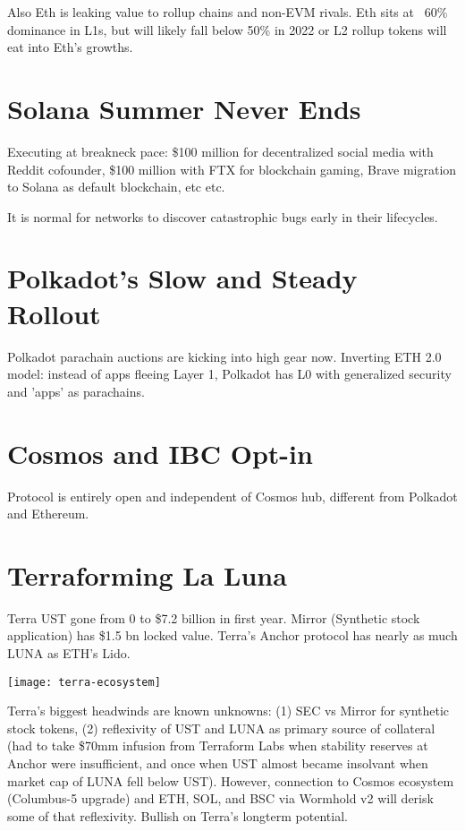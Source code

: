 \documentclass{../notes}
\begin{document}
Also Eth is leaking value to rollup chains and non-EVM rivals. Eth sits at ~60\% dominance in L1s, but will likely fall below 50\% in 2022 or L2 rollup tokens will eat into Eth's growths. 

\section{Solana Summer Never Ends}
Executing at breakneck pace: \$100 million for decentralized social media with Reddit cofounder, \$100 million with FTX for blockchain gaming, Brave migration to Solana as default blockchain, etc etc. 

It is normal for networks to discover catastrophic bugs early in their lifecycles. 

\section{Polkadot's Slow and Steady Rollout}
Polkadot parachain auctions are kicking into high gear now. Inverting ETH 2.0 model: instead of apps fleeing Layer 1, Polkadot has L0 with generalized security and 'apps' as parachains. 

\section{Cosmos and IBC Opt-in}
Protocol is entirely open and independent of Cosmos hub, different from Polkadot and Ethereum. 

\section{Terraforming La Luna}
Terra UST gone from 0 to \$7.2 billion in first year. Mirror (Synthetic stock application) has \$1.5 bn locked value. Terra's Anchor protocol has nearly as much LUNA as ETH's Lido. 

\texttt{[image: terra-ecosystem]}

Terra's biggest headwinds are known unknowns: (1) SEC vs Mirror for synthetic stock tokens, (2) reflexivity of UST and LUNA as primary source of collateral (had to take \$70mm infusion from Terraform Labs when stability reserves at Anchor were insufficient, and once when UST almost became insolvant when market cap of LUNA fell below UST). However, connection to Cosmos ecosystem (Columbus-5 upgrade) and ETH, SOL, and BSC via Wormhold v2 will derisk some of that reflexivity. Bullish on Terra's longterm potential. 
\end{document}
